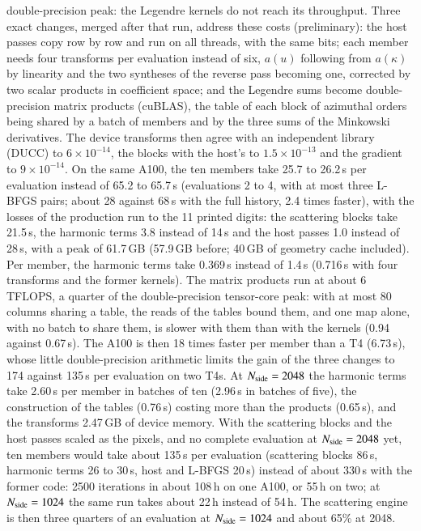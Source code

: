 \documentclass{aa}
\newcommand{\nside}{N_{\rm side}}
\begin{document}
double-precision peak: the Legendre kernels do not reach its throughput. Three exact changes, merged after that run, address these costs (preliminary): the host passes copy row by row and run on all threads, with the same bits; each member needs four transforms per evaluation instead of six, $a(u)$ following from $a(\kappa)$ by linearity and the two syntheses of the reverse pass becoming one, corrected by two scalar products in coefficient space; and the Legendre sums become double-precision matrix products (cuBLAS), the table of each block of azimuthal orders being shared by a batch of members and by the three sums of the Minkowski derivatives. The device transforms then agree with an independent library (DUCC) to $6\times10^{-14}$, the blocks with the host's to $1.5\times10^{-13}$ and the gradient to $9\times10^{-14}$. On the same A100, the ten members take 25.7 to 26.2\,s per evaluation instead of 65.2 to 65.7\,s (evaluations 2 to 4, with at most three L-BFGS pairs; about 28 against 68\,s with the full history, 2.4 times faster), with the losses of the production run to the 11 printed digits: the scattering blocks take 21.5\,s, the harmonic terms 3.8 instead of 14\,s and the host passes 1.0 instead of 28\,s, with a peak of 61.7\,GB (57.9\,GB before; 40\,GB of geometry cache included). Per member, the harmonic terms take 0.369\,s instead of 1.4\,s (0.716\,s with four transforms and the former kernels). The matrix products run at about 6\,TFLOPS, a quarter of the double-precision tensor-core peak: with at most 80 columns sharing a table, the reads of the tables bound them, and one map alone, with no batch to share them, is slower with them than with the kernels (0.94 against 0.67\,s). The A100 is then 18 times faster per member than a T4 (6.73\,s), whose little double-precision arithmetic limits the gain of the three changes to 174 against 135\,s per evaluation on two T4s. At $\nside=2048$ the harmonic terms take 2.60\,s per member in batches of ten (2.96\,s in batches of five), the construction of the tables (0.76\,s) costing more than the products (0.65\,s), and the transforms 2.47\,GB of device memory. With the scattering blocks and the host passes scaled as the pixels, and no complete evaluation at $\nside=2048$ yet, ten members would take about 135\,s per evaluation (scattering blocks 86\,s, harmonic terms 26 to 30\,s, host and L-BFGS 20\,s) instead of about 330\,s with the former code: 2500 iterations in about 108\,h on one A100, or 55\,h on two; at $\nside=1024$ the same run takes about 22\,h instead of 54\,h. The scattering engine is then three quarters of an evaluation at $\nside=1024$ and about 65\% at 2048.
\end{document}
